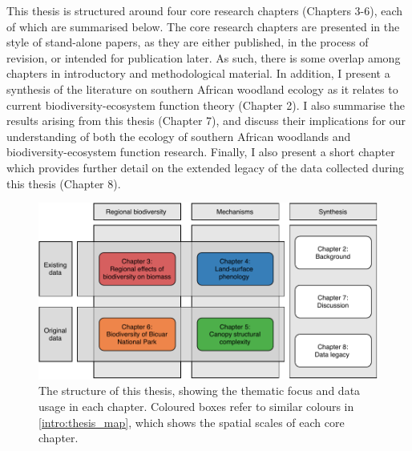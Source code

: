 \begin{refsection}
This thesis is structured around four core research chapters (Chapters 3-6), each of which are summarised below. The core research chapters are presented in the style of stand-alone papers, as they are either published, in the process of revision, or intended for publication later. As such, there is some overlap among chapters in introductory and methodological material. In addition, I present a synthesis of the literature on southern African woodland ecology as it relates to current biodiversity-ecosystem function theory (Chapter 2). I also summarise the results arising from this thesis (Chapter 7), and discuss their implications for our understanding of both the ecology of southern African woodlands and biodiversity-ecosystem function research. Finally, I also present a short chapter which provides further detail on the extended legacy of the data collected during this thesis (Chapter 8). 

\begin{figure}[tb]
	\includegraphics[width=\textwidth]{img/thesis_struc}
	\caption[Thesis structure and data usage.]{The structure of this thesis, showing the thematic focus and data usage in each chapter. Coloured boxes refer to similar colours in \autoref{intro:thesis_map}, which shows the spatial scales of each core chapter.}
	\label{intro:thesis_struc}
\end{figure}


\end{refsection}
